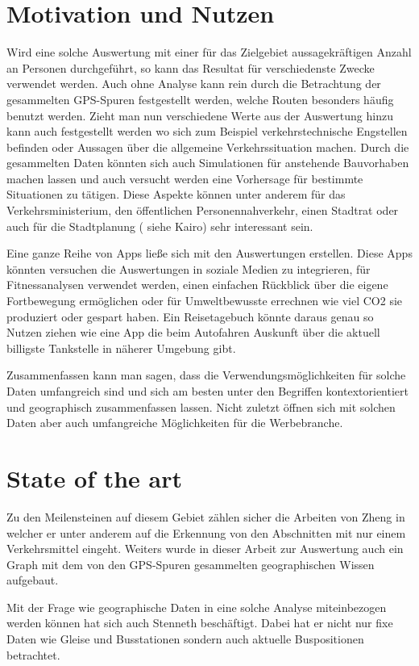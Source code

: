 \section{Motivation und Nutzen}
Wird eine solche Auswertung mit einer für das Zielgebiet aussagekräftigen Anzahl an Personen durchgeführt, so kann das Resultat  für verschiedenste Zwecke verwendet werden. Auch ohne  Analyse kann rein durch die Betrachtung der gesammelten GPS-Spuren festgestellt werden, welche Routen besonders häufig benutzt werden. Zieht man nun verschiedene Werte aus der Auswertung hinzu kann auch festgestellt werden wo sich zum Beispiel verkehrstechnische Engstellen befinden oder Aussagen über die allgemeine Verkehrssituation machen. Durch die gesammelten Daten könnten sich auch Simulationen für anstehende Bauvorhaben machen lassen und auch versucht werden eine Vorhersage für bestimmte Situationen zu tätigen. Diese Aspekte können unter anderem für das Verkehrsministerium,  den öffentlichen Personennahverkehr, einen Stadtrat oder auch für die Stadtplanung ( siehe Kairo) sehr interessant sein.

Eine ganze Reihe von Apps ließe sich mit den Auswertungen erstellen. Diese Apps könnten versuchen die Auswertungen in soziale Medien zu integrieren, für Fitnessanalysen verwendet werden, einen einfachen Rückblick über die eigene Fortbewegung ermöglichen oder für Umweltbewusste errechnen wie viel CO2 sie produziert oder gespart haben. Ein Reisetagebuch könnte daraus genau so Nutzen ziehen wie eine App die beim Autofahren Auskunft über die aktuell billigste Tankstelle in näherer Umgebung gibt. 

Zusammenfassen kann man sagen, dass die Verwendungsmöglichkeiten für solche Daten umfangreich sind und sich am besten unter den Begriffen kontextorientiert und geographisch zusammenfassen lassen. Nicht zuletzt öffnen sich mit solchen Daten aber auch umfangreiche Möglichkeiten für die Werbebranche.


\section{State of the art}
Zu den Meilensteinen auf diesem Gebiet zählen sicher die Arbeiten von Zheng in welcher er unter anderem auf die Erkennung von den Abschnitten mit nur einem Verkehrsmittel eingeht. Weiters wurde in dieser Arbeit zur Auswertung auch ein Graph mit dem von den GPS-Spuren gesammelten geographischen Wissen aufgebaut.

Mit der Frage wie geographische Daten in eine solche Analyse miteinbezogen werden können hat sich auch  Stenneth beschäftigt. Dabei hat er nicht nur fixe Daten wie Gleise und Busstationen sondern auch aktuelle Buspositionen betrachtet. 

